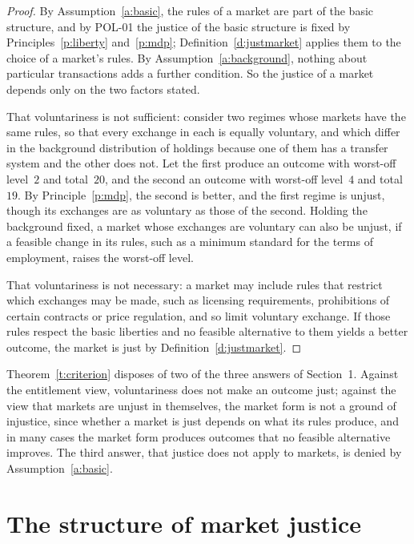 \documentclass{situationist-preprint}
\begin{document}
\begin{proof}
By Assumption~\ref{a:basic}, the rules of a market are part of the basic structure, and by POL-01 the justice of the basic structure is fixed by Principles~\ref{p:liberty} and~\ref{p:mdp}; Definition~\ref{d:justmarket} applies them to the choice of a market's rules. By Assumption~\ref{a:background}, nothing about particular transactions adds a further condition. So the justice of a market depends only on the two factors stated.

That voluntariness is not sufficient: consider two regimes whose markets have the same rules, so that every exchange in each is equally voluntary, and which differ in the background distribution of holdings because one of them has a transfer system and the other does not. Let the first produce an outcome with worst-off level~$2$ and total~$20$, and the second an outcome with worst-off level~$4$ and total~$19$. By Principle~\ref{p:mdp}, the second is better, and the first regime is unjust, though its exchanges are as voluntary as those of the second. Holding the background fixed, a market whose exchanges are voluntary can also be unjust, if a feasible change in its rules, such as a minimum standard for the terms of employment, raises the worst-off level.

That voluntariness is not necessary: a market may include rules that restrict which exchanges may be made, such as licensing requirements, prohibitions of certain contracts or price regulation, and so limit voluntary exchange. If those rules respect the basic liberties and no feasible alternative to them yields a better outcome, the market is just by Definition~\ref{d:justmarket}.
\end{proof}

Theorem~\ref{t:criterion} disposes of two of the three answers of Section~1. Against the entitlement view, voluntariness does not make an outcome just; against the view that markets are unjust in themselves, the market form is not a ground of injustice, since whether a market is just depends on what its rules produce, and in many cases the market form produces outcomes that no feasible alternative improves. The third answer, that justice does not apply to markets, is denied by Assumption~\ref{a:basic}.

\section{The structure of market justice}
\end{document}

